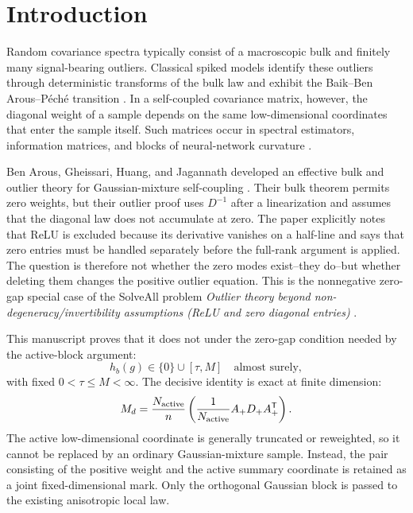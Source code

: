 \section{Introduction}

Random covariance spectra typically consist of a macroscopic bulk and finitely many signal-bearing outliers. Classical spiked models identify these outliers through deterministic transforms of the bulk law and exhibit the Baik--Ben Arous--P\'ech\'e transition \cite{MarchenkoPastur1967,BBP2005,BenaychGeorgesNadakuditi2011}. In a self-coupled covariance matrix, however, the diagonal weight of a sample depends on the same low-dimensional coordinates that enter the sample itself. Such matrices occur in spectral estimators, information matrices, and blocks of neural-network curvature \cite{BenArousEtAl2025,KovacevicEtAl2025}.

Ben Arous, Gheissari, Huang, and Jagannath developed an effective bulk and outlier theory for Gaussian-mixture self-coupling \cite{BenArousEtAl2025}. Their bulk theorem permits zero weights, but their outlier proof uses $D^{-1}$ after a linearization and assumes that the diagonal law does not accumulate at zero. The paper explicitly notes that ReLU is excluded because its derivative vanishes on a half-line and says that zero entries must be handled separately before the full-rank argument is applied. The question is therefore not whether the zero modes exist--they do--but whether deleting them changes the positive outlier equation.  This is the nonnegative zero-gap special case of the SolveAll problem \emph{Outlier theory beyond non-degeneracy/invertibility assumptions (ReLU and zero diagonal entries)} \cite{SolveAllProblem}.

This manuscript proves that it does not under the zero-gap condition needed by the active-block argument:
\begin{equation}
 h_b(g)\in\{0\}\cup[\tau,M]\quad\text{almost surely},
\end{equation}
with fixed $0<\tau\le M<\infty$. The decisive identity is exact at finite dimension:
\begin{equation}
 M_d=\frac{N_{\rm active}}{n}
 \left(\frac1{N_{\rm active}}A_+D_+A_+^{\mathsf T}\right).
\end{equation}
The active low-dimensional coordinate is generally truncated or reweighted, so it cannot be replaced by an ordinary Gaussian-mixture sample. Instead, the pair consisting of the positive weight and the active summary coordinate is retained as a joint fixed-dimensional mark. Only the orthogonal Gaussian block is passed to the existing anisotropic local law.

